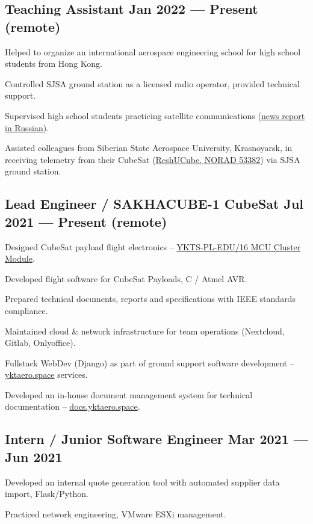 \documentclass[letter,10pt]{article}
\begin{document}
\subsection{{Teaching Assistant \hfill Jan 2022 --- Present (remote)}}
\begin{zitemize}
\item Helped to organize an international aerospace engineering school for high school students from Hong Kong. 
\item Controlled SJSA ground station as a licensed radio operator, provided technical support.
\item Supervised high school students practicing satellite communications (\href{https://www.yakutia.kp.ru/daily/27434.5/4635501/}{news report in Russian}).
\item Assisted colleagues from Siberian State Aerospace University, Krasnoyarsk, in receiving telemetry from their CubeSat (\href{https://db.satnogs.org/satellite/EUTM-6475-4739-7036-7152}{ReshUCube, NORAD 53382}) via SJSA ground station.
\end{zitemize}

\subsection{{Lead Engineer / SAKHACUBE-1 CubeSat \hfill Jul 2021 --- Present (remote)}}
\begin{zitemize}
\item Designed CubeSat payload flight electronics -- \href{https://yktaero.space/projects/item/ykts-pl-edu16-sptx}{YKTS-PL-EDU/16 MCU Cluster Module}.
\item Developed flight software for CubeSat Payloads, C / Atmel AVR.
\item Prepared technical documents, reports and specifications with IEEE standards compliance.
\item Maintained cloud \& network infrastructure for team operations (Nextcloud, Gitlab, Onlyoffice).
\item Fullstack WebDev (Django) as part of ground support software development -- \url{yktaero.space} services.
\item Developed an in-house document management system for technical documentation -- \url{docs.yktaero.space}.
\end{zitemize}

\subsection{{Intern / Junior Software Engineer \hfill Mar 2021 --- Jun 2021}}
\begin{zitemize}
\item Developed an internal quote generation tool with automated supplier data import, Flask/Python.
\item Practiced network engineering, VMware ESXi management.
\end{zitemize}
\end{document}

